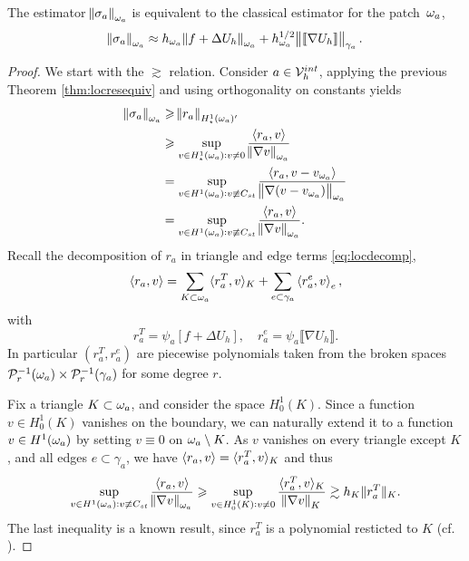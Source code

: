 \documentclass[thesis.tex]{subfiles}
\begin{document}
\begin{lem}
  \label{lem:starequiv}
  The estimator $\norm{\sigma_a}_{\omega_a}$ is equivalent to the classical estimator for the patch~$\omega_a$, 
  \[
    \norm{\sigma_a}_{\omega_a} \approx h_{\omega_a}\norm{f + \Delta U_h}_{\omega_a} + h^{1/2}_{\omega_a} \norm{\llbracket \nabla U_h  \rrbracket}_{\gamma_a}.
  \]
\end{lem}
\begin{proof}
  We start with the $\gtrsim$ relation.  Consider $a \in \mathcal{V}_h^{int}$, applying the previous Theorem \ref{thm:locresequiv} and using orthogonality on constants yields  
  \begin{align*}
    \norm{\sigma_a}_{\omega_a} &\geqslant \norm{r_a}_{H^1_\star(\omega_a)'} \\
    &\geqslant \sup_{v \in H^1_\star(\omega_a) : v \ne 0} { \left \langle r_a, v \right \rangle \over \norm{\nabla v}_{\omega_a}} \\
    &= \sup_{v \in H^1(\omega_a) : v \not \equiv C_{st}} { \left \langle r_a, v - v_{\omega_a} \right \rangle \over \norm{\nabla (v - v_{\omega_a})}_{\omega_a}} \\
          &= \sup_{v \in H^1(\omega_a) : v \not \equiv C_{st}} { \left \langle r_a, v \right \rangle \over \norm{\nabla v}_{\omega_a}}.
  \end{align*}
  Recall the decomposition of $r_a$ in triangle and edge terms \eqref{eq:locdecomp},
  \[
    \left \langle r_a,v \right \rangle = \sum_{K\subset \omega_a} \langle{r^T_a, v}\rangle_K + \sum_{e \subset \gamma_a} \left \langle r^e_a, v \right \rangle_e,
  \]
  with 
  \[
   r^T_a = \psi_a \left[ f + \Delta U_h \right], \quad r^e_a = \psi_a \llbracket \nabla U_h \rrbracket.
  \]
  In particular $(r^T_a, r^e_a)$ are piecewise polynomials taken from the  broken spaces $\mathcal{P}_r^{-1}(\omega_a)\times \mathcal{P}_r^{-1}(\gamma_a)$ for some degree $r$.

  Fix a triangle $K \subset \omega_a$, and consider the space $H_0^1(K)$. Since a function $v \in H_0^1(K)$ vanishes on the boundary, 
  we can naturally extend it to a function $v \in H^1(\omega_a)$ by setting $v \equiv 0$ on $\omega_a \setminus K$. As $v$
  vanishes on every triangle except $K$, and all edges $e \subset \gamma_a$, we have $\left \langle r_a, v \right \rangle = \langle{r_a^T, v}\rangle_K$ and thus
  \[
         \sup_{v \in H^1(\omega_a) : v \not \equiv C_{st}} { \left \langle r_a, v \right \rangle \over \norm{\nabla v}_{\omega_a}} 
         \geqslant \sup_{v \in H_0^1(K) : v \ne 0} { \langle{r^T_a, v}\rangle_K \over \norm{\nabla v}_{K}}
         \gtrsim h_K \|{r^T_a}\|_K.
  \]
  The last inequality is a known result, since $r^T_a$ is a polynomial resticted to $K$ (cf. \cite[Ex~9.x.5]{brenner}).
  

\end{proof}
\end{document}
